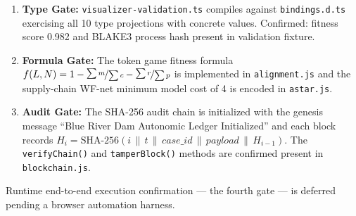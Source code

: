 \begin{enumerate}
  \item \textbf{Type Gate:} \texttt{visualizer-validation.ts} compiles against
        \texttt{bindings.d.ts} exercising all 10 type projections with concrete values.
        Confirmed: fitness score 0.982 and BLAKE3 process hash present in validation fixture.
  \item \textbf{Formula Gate:} The token game fitness formula
        $f(L,N) = 1 - \nicefrac{\sum m}{\sum c} - \nicefrac{\sum r}{\sum p}$ is implemented
        in \texttt{alignment.js} and the supply-chain WF-net minimum model cost of 4 is encoded
        in \texttt{astar.js}.
  \item \textbf{Audit Gate:} The SHA-256 audit chain is initialized with the genesis message
        ``Blue River Dam Autonomic Ledger Initialized'' and each block records
        $H_i = \mathrm{SHA\text{-}256}(i \,\|\, t \,\|\, \mathit{case\_id} \,\|\, \mathit{payload} \,\|\, H_{i-1})$.
        The \texttt{verifyChain()} and \texttt{tamperBlock()} methods are confirmed present in
        \texttt{blockchain.js}.
\end{enumerate}

Runtime end-to-end execution confirmation — the fourth gate — is deferred pending a browser
automation harness.
